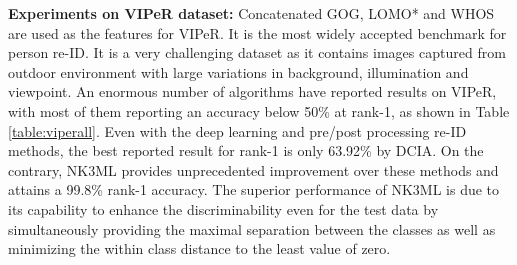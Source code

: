 \documentclass[runningheads]{llncs}
\begin{document}
\setlength{\parskip}{1.5mm}
\noindent \textbf{Experiments on VIPeR dataset:}
Concatenated GOG, LOMO* and WHOS are used as the features for VIPeR. It is the most widely accepted benchmark for person re-ID. It is a very challenging dataset as it contains images captured from outdoor environment with large variations in background, illumination and viewpoint. An enormous number of algorithms have reported results on VIPeR, with most of them reporting an accuracy below 50\% at rank-1, as shown in Table \ref{table:viperall}. Even with the deep learning and pre/post processing re-ID methods, the best reported result for rank-1 is only 63.92\% by DCIA\cite{DCIA}. On the contrary, NK3ML provides unprecedented improvement over these methods and attains a 99.8\% rank-1 accuracy.
The superior performance of NK3ML is due to its capability to enhance the discriminability  even for the test data by simultaneously providing the maximal separation between the classes as well as minimizing the within class distance to the least value of zero.
\setlength{\parskip}{0mm}
\end{document}
